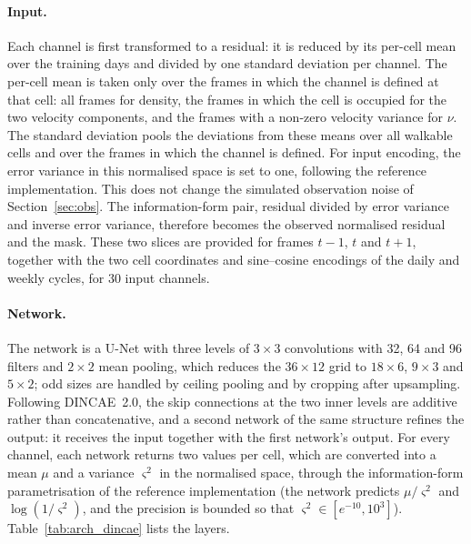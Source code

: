 \documentclass[english, 12pt, a4paper, elec, utf8, a-2b, online]{aaltothesis}
\begin{document}
\paragraph{Input.}
Each channel is first transformed to a residual: it is reduced by its per-cell mean over
the training days and divided by one standard deviation per channel. The
per-cell mean is taken only over the frames in which the channel is defined at
that cell: all frames for density, the frames in which the cell is occupied for
the two velocity components, and the frames with a non-zero velocity variance
for $\nu$. The standard deviation pools the deviations from these means over
all walkable cells and over the frames in which the channel is defined. For input encoding, the error variance in this normalised space is
set to one, following the reference implementation. This does not change the
simulated observation noise of Section~\ref{sec:obs}. The information-form pair,
residual divided by error variance and inverse error variance, therefore
becomes the observed normalised residual and the mask. These two slices are provided for frames
$t-1$, $t$ and $t+1$, together with the two cell coordinates and sine--cosine
encodings of the daily and weekly cycles, for 30 input channels.

\paragraph{Network.}
The network is a U-Net with three levels of $3 \times 3$ convolutions with
32, 64 and 96 filters and $2 \times 2$ mean pooling, which reduces the $36
\times 12$ grid to $18 \times 6$, $9 \times 3$ and $5 \times 2$; odd sizes are
handled by ceiling pooling and by cropping after upsampling. Following DINCAE~2.0,
the skip connections at the two inner levels are additive rather than
concatenative, and a second network of the same structure refines the output:
it receives the input together with the first network's output. For every
channel, each network returns two values per cell, which are converted into a
mean $\mu$ and a variance $\varsigma^2$ in the normalised space, through the
information-form parametrisation of the reference implementation (the network
predicts $\mu/\varsigma^2$ and $\log(1/\varsigma^2)$, and the precision is bounded so that $\varsigma^2
\in [e^{-10}, 10^{3}]$). Table~\ref{tab:arch_dincae} lists the layers.
\end{document}
